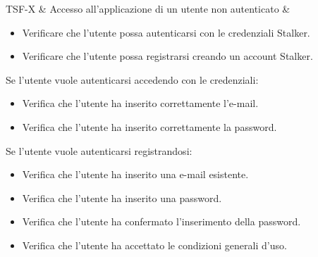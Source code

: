 

TSF-X & Accesso all'applicazione di un utente non autenticato & \begin{itemize}
    \item Verificare che l'utente possa autenticarsi con le credenziali Stalker.
    \item Verificare che l'utente possa registrarsi creando un account Stalker.
\end{itemize}
Se l'utente vuole autenticarsi accedendo con le credenziali:
\begin{itemize}
    \item Verifica che l'utente ha inserito correttamente l'e-mail.
    \item Verifica che l'utente ha inserito correttamente la password.
\end{itemize}
Se l'utente vuole autenticarsi registrandosi:
\begin{itemize}
    \item Verifica che l'utente ha inserito una e-mail esistente.
    \item Verifica che l'utente ha inserito una password.
    \item Verifica che l'utente ha confermato l'inserimento della password.
    \item Verifica che l'utente ha accettato le condizioni generali d'uso.
\end{itemize}






